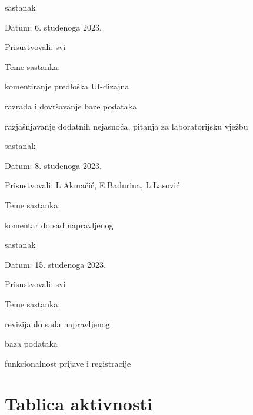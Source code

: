 \begin{packed_enum}
			\item  sastanak
			\item[] \begin{packed_item}
				\item Datum: 6. studenoga 2023.
				\item Prisustvovali: svi
				\item Teme sastanka:
				\begin{packed_item}
					\item  komentiranje predloška UI-dizajna
					\item  razrada i dovršavanje baze podataka
					\item  razjašnjavanje dodatnih nejasnoća, pitanja za laboratorijsku vježbu
				\end{packed_item}
			\end{packed_item}
			
			\item  sastanak			
			\item[] \begin{packed_item}
				\item Datum: 8. studenoga 2023.
				\item Prisustvovali: L.Akmačić, E.Badurina, L.Lasović
				\item Teme sastanka:
				\begin{packed_item}
					\item  komentar do sad napravljenog
				\end{packed_item}
			\end{packed_item}
			
			\item  sastanak			
			\item[] \begin{packed_item}
				\item Datum: 15. studenoga 2023.
				\item Prisustvovali: svi
				\item Teme sastanka:
				\begin{packed_item}
					\item  revizija do sada napravljenog
					\item  baza podataka
					\item  funkcionalnost prijave i registracije
				\end{packed_item}
			\end{packed_item}
			
		\end{packed_enum}
		
		\eject
		\section*{Tablica aktivnosti}
		
